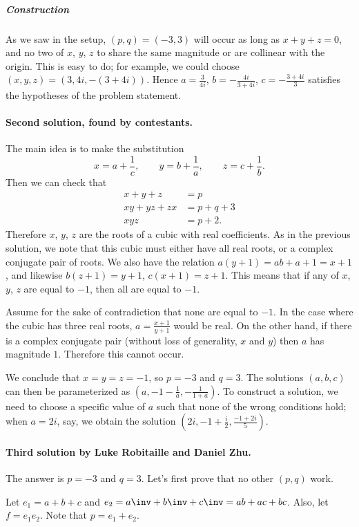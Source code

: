 \subparagraph{Construction}
As we saw in the setup, $(p,q) = (-3,3)$ will occur as long as $x+y+z = 0$,
and no two of $x$, $y$, $z$ to share the same magnitude or are collinear with the origin.
This is easy to do; for example,
we could choose $(x, y, z) = (3, 4i, -(3+4i))$.
Hence $a = \frac{3}{4i}$, $b = -\frac{4i}{3+4i}$, $c = -\frac{3+4i}{3}$
satisfies the hypotheses of the problem statement.

\paragraph{Second solution, found by contestants.}
The main idea is to make the substitution
\[ x=a+\frac{1}{c}, \qquad y=b+\frac{1}{a}, \qquad z=c+\frac{1}{b}. \]
Then we can check that
\begin{align*}
  x+y+z &= p \\
  xy+yz+zx &= p+q+3 \\
  xyz &= p+2.
\end{align*}
Therefore $x$, $y$, $z$ are the roots of a cubic with real coefficients.
As in the previous solution, we note that this cubic must either
have all real roots, or a complex conjugate pair of roots.
We also have the relation $a(y+1)=ab+a+1=x+1$,
and likewise $b(z+1)=y+1$, $c(x+1)=z+1$.
This means that if any of $x$, $y$, $z$ are equal to $-1$,
then all are equal to $-1$.

Assume for the sake of contradiction that none are equal to $-1$.
In the case where the cubic has three real roots,
$a=\frac{x+1}{y+1}$ would be real.
On the other hand, if there is a complex conjugate pair
(without loss of generality, $x$ and $y$) then $a$ has magnitude $1$.
Therefore this cannot occur.

We conclude that $x=y=z=-1$, so $p=-3$ and $q=3$.
The solutions $(a, b, c)$ can then be parameterized
as $(a, -1-\frac{1}{a}, -\frac{1}{1+a})$.
To construct a solution, we need to choose a specific value of $a$ such that
none of the wrong conditions hold;
when $a=2i$, say, we obtain the solution $(2i, -1+\frac{i}{2}, \frac{-1+2i}{5})$.

\paragraph{Third solution by Luke Robitaille and Daniel Zhu.}
The answer is $p = -3$ and $q = 3$.
Let's first prove that no other $(p, q)$ work.

Let $e_1 = a + b + c$ and $e_2 = a\inv + b\inv + c\inv = ab + ac + bc$.
Also, let $f = e_1e_2$. Note that $p = e_1 + e_2$.

